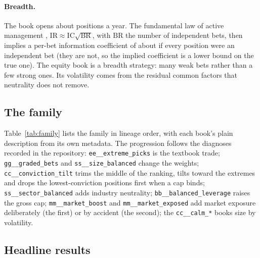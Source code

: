 \documentclass[11pt]{article}
\makeatletter
\theoremstyle{definition}
\newcommand{\1}{\mathbf{1}}
\newcommand{\sn}[1]{\texttt{\sn@scan#1\@nil}}
\def\sn@scan#1{\ifx#1\@nil\else\ifx#1_\_\allowbreak\else#1\fi\expandafter\sn@scan\fi}
\makeatother
\begin{document}
\paragraph{Breadth.} The book opens about  positions a year. The fundamental law of active management
\citep{Grinold1989}, $\mathrm{IR}\approx\mathrm{IC}\sqrt{\mathrm{BR}}$, with $\mathrm{BR}$ the number of independent bets, then
implies a per-bet information coefficient of about  if every position were an independent bet (they are
not, so the implied coefficient is a lower bound on the true one). The equity book is a breadth strategy: many weak bets rather than a
few strong ones. Its volatility comes from the residual common factors that neutrality does not remove.

\subsection{The family}\label{sec:family}

Table~\ref{tab:family} lists the family in lineage order, with each book's plain description from its own metadata. The progression
follows the diagnoses recorded in the repository: \sn{extreme_picks} is the textbook trade; \sn{graded_bets} and \sn{size_balanced} change the
weights; \sn{conviction_tilt} trims the middle of the ranking, tilts toward the extremes and drops the lowest-conviction positions first when a cap binds;
\sn{sector_balanced} adds industry neutrality; \sn{balanced_leverage} raises the gross cap; \sn{market_boost} and \sn{market_exposed} add market exposure
deliberately (the first) or by accident (the second); the \sn{calm_*} books size by volatility.

\begin{table}[t]\centering
\caption{The equity family in lineage order. ``Unit / cap'' is the base-unit fraction and the gross-exposure cap
(open book, at sizing time). Returns, Sharpe ratios and drawdowns are from \texttt{results/<name>/summary.json}.}\label{tab:family}

\end{table}

\subsection{Headline results}\label{sec:eqresults}

\begin{table}[t]\centering
\caption{Equity headline books, 1996--2013 (net of modeled costs; borrow and financing not modeled).}\label{tab:eqheadline}

\end{table}
\end{document}
